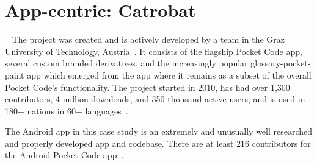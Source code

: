 

\section{App-centric: Catrobat}~\label{case-study-overview-catrobat}
The  project was created and is actively developed by a team in the Graz University of Technology, Austria~. It consists of the flagship Pocket Code app, several custom branded derivatives, and the increasingly popular \Gls{glossary-pocket-paint} app which emerged from the  app where it remains as a subset of the overall Pocket Code's functionality. The project started in 2010, has had over 1,300 contributors, 4 million downloads, and 350 thousand active users, and is used in 180+ nations in 60+ languages~.

The Android app in this case study is an extremely and unusually well researched and properly developed app and codebase.  There are at least 216 contributors for the Android Pocket Code app~.

